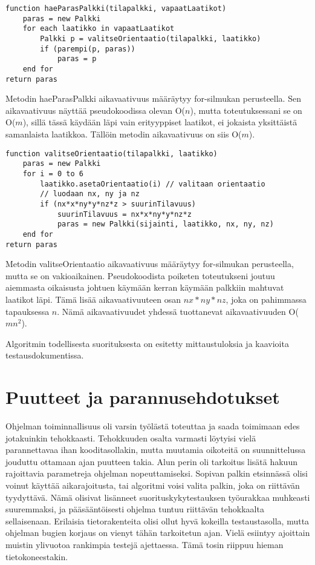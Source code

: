 \documentclass[a4paper,12pt, titlepage]{article}
\begin{document}
\begin{verbatim}
function haeParasPalkki(tilapalkki, vapaatLaatikot)
    paras = new Palkki
    for each laatikko in vapaatLaatikot
        Palkki p = valitseOrientaatio(tilapalkki, laatikko)
        if (parempi(p, paras))
            paras = p
    end for
return paras
\end{verbatim}
Metodin haeParasPalkki aikavaativuus määräytyy for-silmukan perusteella. Sen aikavaativuus näyttää pseudokoodissa olevan O($n$), mutta toteutuksessani se on O($m$), sillä tässä käydään läpi vain erityyppiset laatikot, ei jokaista yksittäistä samanlaista laatikkoa. Tällöin metodin aikavaativuus on siis O($m$).

\begin{verbatim}
function valitseOrientaatio(tilapalkki, laatikko)
    paras = new Palkki
    for i = 0 to 6
        laatikko.asetaOrientaatio(i) // valitaan orientaatio
        // luodaan nx, ny ja nz
        if (nx*x*ny*y*nz*z > suurinTilavuus)
            suurinTilavuus = nx*x*ny*y*nz*z
            paras = new Palkki(sijainti, laatikko, nx, ny, nz)
    end for
return paras
\end{verbatim}

Metodin valitseOrientaatio aikavaativuus määräytyy for-silmukan perusteella, mutta se on vakioaikainen. Pseudokoodista poiketen toteutukseni joutuu aiemmasta oikaisusta johtuen käymään kerran käymään palkkiin mahtuvat laatikot läpi. Tämä lisää aikavaativuuteen osan $nx*ny*nz$, joka on pahimmassa tapauksessa $n$. Nämä aikavaativuudet yhdessä tuottanevat aikavaativuuden O($mn^2$).

\noindent
Algoritmin todellisesta suorituksesta on esitetty mittaustuloksia ja kaavioita testausdokumentissa.

\section*{Puutteet ja parannusehdotukset}
Ohjelman toiminnallisuus oli varsin työlästä toteuttaa ja saada toimimaan edes jotakuinkin tehokkaasti. Tehokkuuden osalta varmasti löytyisi vielä parannettavaa ihan kooditasollakin, mutta muutamia oikoteitä on suunnittelussa jouduttu ottamaan ajan puutteen takia. Alun perin oli tarkoitus lisätä hakuun rajoittavia parametreja ohjelman nopeuttamiseksi. Sopivan palkin etsinnässä olisi voinut käyttää aikarajoitusta, tai algoritmi voisi valita palkin, joka on riittävän tyydyttävä. Nämä olisivat lisänneet suorituskykytestauksen työurakkaa muhkeasti suuremmaksi, ja pääsääntöisesti ohjelma tuntuu riittävän tehokkaalta sellaisenaan. Erilaisia tietorakenteita olisi ollut hyvä kokeilla testaustasolla, mutta ohjelman bugien korjaus on vienyt tähän tarkoitetun ajan. Vielä esiintyy ajoittain muistin ylivuotoa rankimpia testejä ajettaessa. Tämä tosin riippuu hieman tietokoneestakin.
\end{document}
